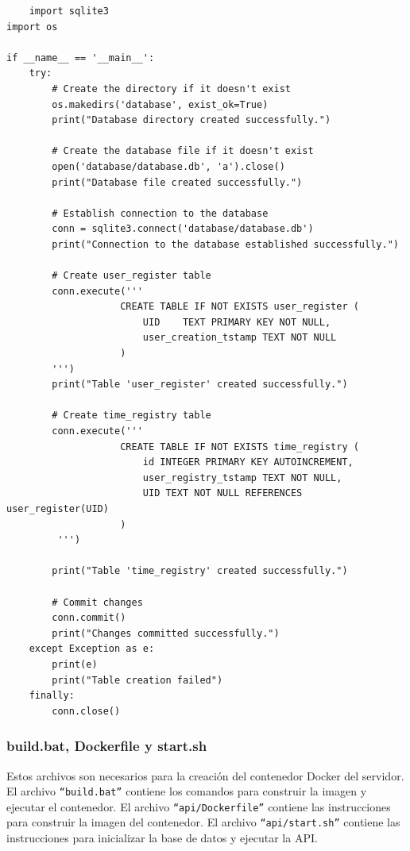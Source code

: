 \documentclass{article}
\begin{document}
\begin{lstlisting}
	import sqlite3
import os

if __name__ == '__main__':
    try:
        # Create the directory if it doesn't exist
        os.makedirs('database', exist_ok=True)
        print("Database directory created successfully.")

        # Create the database file if it doesn't exist
        open('database/database.db', 'a').close()
        print("Database file created successfully.")

        # Establish connection to the database
        conn = sqlite3.connect('database/database.db')
        print("Connection to the database established successfully.")

        # Create user_register table
        conn.execute('''
                    CREATE TABLE IF NOT EXISTS user_register (
                        UID    TEXT PRIMARY KEY NOT NULL,
                        user_creation_tstamp TEXT NOT NULL
                    )
        ''')
        print("Table 'user_register' created successfully.")

        # Create time_registry table
        conn.execute('''
                    CREATE TABLE IF NOT EXISTS time_registry (
                        id INTEGER PRIMARY KEY AUTOINCREMENT,
                        user_registry_tstamp TEXT NOT NULL,
                        UID TEXT NOT NULL REFERENCES user_register(UID)
                    )
         ''')

        print("Table 'time_registry' created successfully.")

        # Commit changes
        conn.commit()
        print("Changes committed successfully.")
    except Exception as e:
        print(e)
        print("Table creation failed")
    finally:
        conn.close()

\end{lstlisting}

\subsubsection{build.bat, Dockerfile y start.sh}
Estos archivos son necesarios para la creación del contenedor Docker del servidor.
El archivo \texttt{``build.bat''} contiene los comandos para construir la imagen y ejecutar el contenedor.
El archivo \texttt{``api/Dockerfile''} contiene las instrucciones para construir la imagen del contenedor.
El archivo \texttt{``api/start.sh''} contiene las instrucciones para inicializar la base de datos y ejecutar la API.
\end{document}
